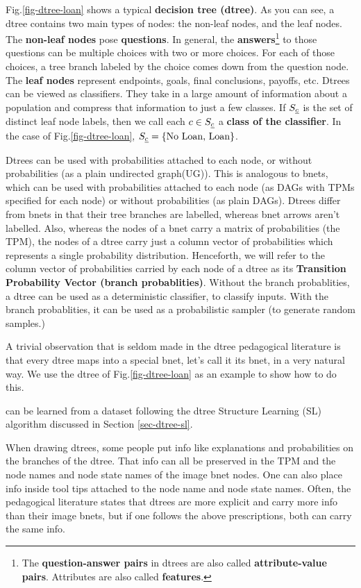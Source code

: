 Fig.\ref{fig-dtree-loan}
shows a typical {\bf decision tree (dtree)}.
As you can see,
a dtree contains two main types
of nodes: the non-leaf nodes,
and the leaf nodes.
The {\bf non-leaf nodes} pose
{\bf questions}. In general,
the {\bf answers}\footnote
{The {\bf question-answer pairs}
in dtrees are
also called
{\bf attribute-value pairs}.
Attributes are also
called {\bf features}.}
 to those
questions can
be multiple choices with
two or more choices.
For each of those choices,
a tree branch labeled by the choice
 comes down from the 
question node.
The {\bf leaf nodes} represent
endpoints, goals, final
conclusions, payoffs, etc.
Dtrees can be viewed
as classifiers. They
take in a large amount 
of information about a population 
and compress that information
to just a few classes.
If $S_\rvc$ is the 
set of distinct leaf node labels,
then we call each
$c\in S_\rvc$
a  {\bf class of the classifier}.
In the case of
Fig.\ref{fig-dtree-loan},
$S_\rvc=\{\text{No Loan, Loan}\}$.

Dtrees can be used 
with
probabilities attached to each node, or without
probabilities
(as a
plain undirected graph(UG)).
This is analogous to bnets,
which can be used with
probabilities attached to each node
 (as DAGs with
TPMs specified for each node) or without
probabilities (as plain
DAGs).
Dtrees differ 
from bnets in that
their tree branches 
are labelled, whereas bnet arrows
 aren't labelled.
Also,
whereas the nodes of
a bnet carry a matrix of 
probabilities (the TPM),
the nodes of a dtree carry
just a column vector
of probabilities
which represents
a single 
probability distribution.
Henceforth,
we will refer to
the column vector
of probabilities
carried by each node of a dtree
as its {\bf Transition
Probability Vector (branch probablities)}.
Without the branch probablities,
a dtree can be used 
as a deterministic classifier,
to classify inputs.
With the branch probablities,
it can be used as a 
probabilistic sampler (to generate
random samples.)

A trivial 
observation
that is seldom made
in the dtree pedagogical literature
is that every dtree 
maps into a special bnet, 
let's call it
its  bnet,
in a very natural way.
We use the dtree
of Fig.\ref{fig-dtree-loan}
as an example to show 
how to do this. 

can be learned from
a dataset
following
the dtree Structure Learning (SL)
algorithm
discussed in Section \ref{sec-dtree-sl}.



When drawing dtrees,
some people put
info 
like explanations 
and probabilities on the
branches
of  the dtree.
That
info can all
be preserved
in the TPM
and  the
node names and
 node state names
of the image bnet nodes.
One can also place info
inside tool tips attached to
the node name and node state names.
Often,
the pedagogical literature
states that 
dtrees are more explicit and  
carry
more info than their
image bnets,
but if one 
follows the above
prescriptions,
both can carry
the same info.



